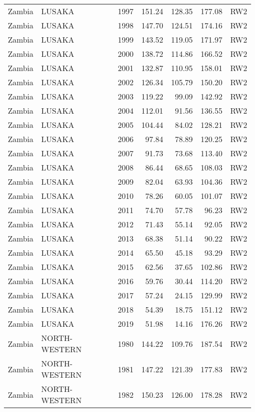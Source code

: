 \begin{longtable}{lllrrrl}
  Zambia & LUSAKA & 1997 & 151.24 & 128.35 & 177.08 & RW2 \\ 
  Zambia & LUSAKA & 1998 & 147.70 & 124.51 & 174.16 & RW2 \\ 
  Zambia & LUSAKA & 1999 & 143.52 & 119.05 & 171.97 & RW2 \\ 
  Zambia & LUSAKA & 2000 & 138.72 & 114.86 & 166.52 & RW2 \\ 
  Zambia & LUSAKA & 2001 & 132.87 & 110.95 & 158.01 & RW2 \\ 
  Zambia & LUSAKA & 2002 & 126.34 & 105.79 & 150.20 & RW2 \\ 
  Zambia & LUSAKA & 2003 & 119.22 & 99.09 & 142.92 & RW2 \\ 
  Zambia & LUSAKA & 2004 & 112.01 & 91.56 & 136.55 & RW2 \\ 
  Zambia & LUSAKA & 2005 & 104.44 & 84.02 & 128.21 & RW2 \\ 
  Zambia & LUSAKA & 2006 & 97.84 & 78.89 & 120.25 & RW2 \\ 
  Zambia & LUSAKA & 2007 & 91.73 & 73.68 & 113.40 & RW2 \\ 
  Zambia & LUSAKA & 2008 & 86.44 & 68.65 & 108.03 & RW2 \\ 
  Zambia & LUSAKA & 2009 & 82.04 & 63.93 & 104.36 & RW2 \\ 
  Zambia & LUSAKA & 2010 & 78.26 & 60.05 & 101.07 & RW2 \\ 
  Zambia & LUSAKA & 2011 & 74.70 & 57.78 & 96.23 & RW2 \\ 
  Zambia & LUSAKA & 2012 & 71.43 & 55.14 & 92.05 & RW2 \\ 
  Zambia & LUSAKA & 2013 & 68.38 & 51.14 & 90.22 & RW2 \\ 
  Zambia & LUSAKA & 2014 & 65.50 & 45.18 & 93.29 & RW2 \\ 
  Zambia & LUSAKA & 2015 & 62.56 & 37.65 & 102.86 & RW2 \\ 
  Zambia & LUSAKA & 2016 & 59.76 & 30.44 & 114.20 & RW2 \\ 
  Zambia & LUSAKA & 2017 & 57.24 & 24.15 & 129.99 & RW2 \\ 
  Zambia & LUSAKA & 2018 & 54.39 & 18.75 & 151.12 & RW2 \\ 
  Zambia & LUSAKA & 2019 & 51.98 & 14.16 & 176.26 & RW2 \\ 
  Zambia & NORTH-WESTERN & 1980 & 144.22 & 109.76 & 187.54 & RW2 \\ 
  Zambia & NORTH-WESTERN & 1981 & 147.22 & 121.39 & 177.83 & RW2 \\ 
  Zambia & NORTH-WESTERN & 1982 & 150.23 & 126.00 & 178.28 & RW2 \\ 

\end{longtable}
